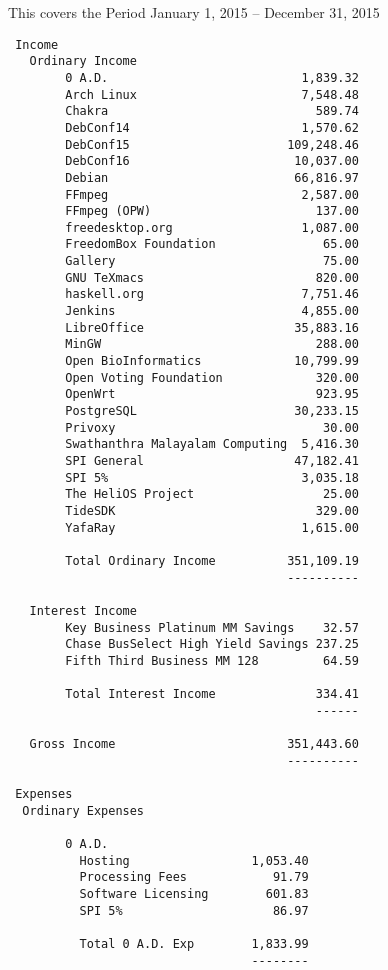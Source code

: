 \documentclass[letterpaper]{report}
\begin{document}
This covers the Period January 1, 2015 -- December 31, 2015

\begin{verbatim}
 Income
   Ordinary Income
        0 A.D.                           1,839.32
        Arch Linux                       7,548.48
        Chakra                             589.74
        DebConf14                        1,570.62
        DebConf15                      109,248.46
        DebConf16                       10,037.00
        Debian                          66,816.97
        FFmpeg                           2,587.00
        FFmpeg (OPW)                       137.00
        freedesktop.org                  1,087.00
        FreedomBox Foundation               65.00
        Gallery                             75.00
        GNU TeXmacs                        820.00
        haskell.org                      7,751.46
        Jenkins                          4,855.00
        LibreOffice                     35,883.16
        MinGW                              288.00
        Open BioInformatics             10,799.99
        Open Voting Foundation             320.00
        OpenWrt                            923.95
        PostgreSQL                      30,233.15
        Privoxy                             30.00
        Swathanthra Malayalam Computing  5,416.30
        SPI General                     47,182.41
        SPI 5%                           3,035.18
        The HeliOS Project                  25.00
        TideSDK                            329.00
        YafaRay                          1,615.00

        Total Ordinary Income          351,109.19
                                       ----------

   Interest Income
        Key Business Platinum MM Savings    32.57
        Chase BusSelect High Yield Savings 237.25
        Fifth Third Business MM 128         64.59

        Total Interest Income              334.41
                                           ------

   Gross Income                        351,443.60
                                       ----------

 Expenses
  Ordinary Expenses

        0 A.D.
          Hosting                 1,053.40
          Processing Fees            91.79
          Software Licensing        601.83
          SPI 5%                     86.97

          Total 0 A.D. Exp        1,833.99
                                  --------


\end{verbatim}
\end{document}
